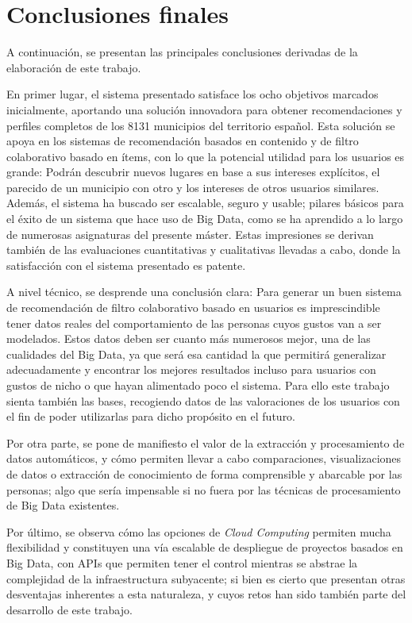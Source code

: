 
\section{Conclusiones finales}

A continuación, se presentan las principales conclusiones derivadas de la elaboración de este trabajo.

En primer lugar, el sistema presentado satisface los ocho objetivos marcados inicialmente, aportando una solución innovadora para obtener recomendaciones y perfiles completos de los 8131 municipios del territorio español. Esta solución se apoya en los sistemas de recomendación basados en contenido y de filtro colaborativo basado en ítems, con lo que la potencial utilidad para los usuarios es grande: Podrán descubrir nuevos lugares en base a sus intereses explícitos, el parecido de un municipio con otro y los intereses de otros usuarios similares. Además, el sistema ha buscado ser escalable, seguro y usable; pilares básicos para el éxito de un sistema que hace uso de Big Data, como se ha aprendido a lo largo de numerosas asignaturas del presente máster. Estas impresiones se derivan también de las evaluaciones cuantitativas y cualitativas llevadas a cabo, donde la satisfacción con el sistema presentado es patente.

A nivel técnico, se desprende una conclusión clara: Para generar un buen sistema de recomendación de filtro colaborativo basado en usuarios es imprescindible tener datos reales del comportamiento de las personas cuyos gustos van a ser modelados. Estos datos deben ser cuanto más numerosos mejor, una de las cualidades del Big Data, ya que será esa cantidad la que permitirá generalizar adecuadamente y encontrar los mejores resultados incluso para usuarios con gustos de nicho o que hayan alimentado poco el sistema. Para ello este trabajo sienta también las bases, recogiendo datos de las valoraciones de los usuarios con el fin de poder utilizarlas para dicho propósito en el futuro.

Por otra parte, se pone de manifiesto el valor de la extracción y procesamiento de datos automáticos, y cómo permiten llevar a cabo comparaciones, visualizaciones de datos o extracción de conocimiento de forma comprensible y abarcable por las personas; algo que sería impensable si no fuera por las técnicas de procesamiento de Big Data existentes.

Por último, se observa cómo las opciones de \textit{Cloud Computing} permiten mucha flexibilidad y constituyen una vía escalable de despliegue de proyectos basados en Big Data, con APIs que permiten tener el control mientras se abstrae la complejidad de la infraestructura subyacente; si bien es cierto que presentan otras desventajas inherentes a esta naturaleza, y cuyos retos han sido también parte del desarrollo de este trabajo.

